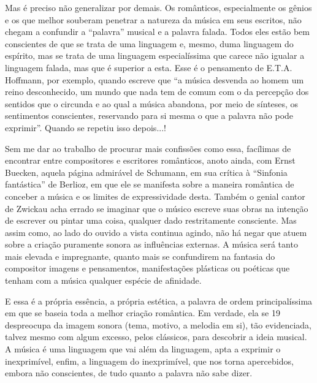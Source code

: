 Mas é preciso não generalizar por demais. Os românticos, especialmente
os gênios e os que melhor souberam penetrar a natureza da música em seus
escritos, não chegam a confundir a ``palavra'' musical e a palavra
falada. Todos eles estão bem conscientes de que se trata de uma
linguagem e, mesmo, duma linguagem do espírito, mas se trata de uma
linguagem especialíssima que carece não igualar a linguagem falada, mas
que é superior a esta. Esse é o pensamento de E.T.A. Hoffmann, por
exemplo, quando escreve que ``a música desvenda ao homem um reino
desconhecido, um mundo que nada tem de comum com o da percepção dos
sentidos que o circunda e ao qual a música abandona, por meio de
sínteses, os sentimentos conscientes, reservando para si mesma o que a
palavra não pode exprimir''. Quando se repetiu isso depois...!

Sem me dar ao trabalho de procurar mais confissões como essa, facílimas
de encontrar entre compositores e escritores românticos, anoto ainda,
com Ernst Buecken, aquela página admirável de Schumann, em sua crítica à
``Sinfonia fantástica'' de Berlioz, em que ele se manifesta sobre a
maneira romântica de conceber a música e os limites de expressividade
desta. Também o genial cantor de Zwickau acha errado se imaginar que o
músico escreve suas obras na intenção de escrever ou pintar uma coisa,
qualquer dado restritamente consciente. Mas assim como, ao lado do
ouvido a vista continua agindo, não há negar que atuem sobre a criação
puramente sonora as influências externas. A música será tanto mais
elevada e impregnante, quanto mais se confundirem na fantasia do
compositor imagens e pensamentos, manifestações plásticas ou poéticas
que tenham com a música qualquer espécie de afinidade.

E essa é a própria essência, a própria estética, a palavra de ordem
principalíssima em que se baseia toda a melhor criação romântica. Em
verdade, ela se 19 despreocupa da imagem sonora (tema, motivo, a melodia
em si), tão evidenciada, talvez mesmo com algum excesso, pelos
clássicos, para descobrir a ideia musical. A música é uma linguagem que
vai além da linguagem, apta a exprimir o inexprimível, enfim, a
linguagem do inexprimível, que nos torna apercebidos, embora não
conscientes, de tudo quanto a palavra não sabe dizer.

